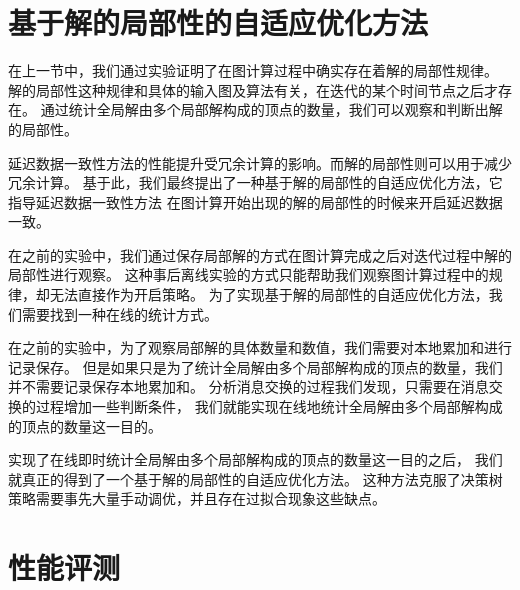 
\section{基于解的局部性的自适应优化方法}
在上一节中，我们通过实验证明了在图计算过程中确实存在着解的局部性规律。
解的局部性这种规律和具体的输入图及算法有关，在迭代的某个时间节点之后才存在。
通过统计全局解由多个局部解构成的顶点的数量，我们可以观察和判断出解的局部性。


延迟数据一致性方法的性能提升受冗余计算的影响。而解的局部性则可以用于减少冗余计算。
基于此，我们最终提出了一种基于解的局部性的自适应优化方法，它指导延迟数据一致性方法
在图计算开始出现的解的局部性的时候来开启延迟数据一致。

在之前的实验中，我们通过保存局部解的方式在图计算完成之后对迭代过程中解的局部性进行观察。
这种事后离线实验的方式只能帮助我们观察图计算过程中的规律，却无法直接作为开启策略。
为了实现基于解的局部性的自适应优化方法，我们需要找到一种在线的统计方式。

在之前的实验中，为了观察局部解的具体数量和数值，我们需要对本地累加和进行记录保存。
但是如果只是为了统计全局解由多个局部解构成的顶点的数量，我们并不需要记录保存本地累加和。
分析消息交换的过程我们发现，只需要在消息交换的过程增加一些判断条件，
我们就能实现在线地统计全局解由多个局部解构成的顶点的数量这一目的。

实现了在线即时统计全局解由多个局部解构成的顶点的数量这一目的之后，
我们就真正的得到了一个基于解的局部性的自适应优化方法。
这种方法克服了决策树策略需要事先大量手动调优，并且存在过拟合现象这些缺点。

\section{性能评测}

